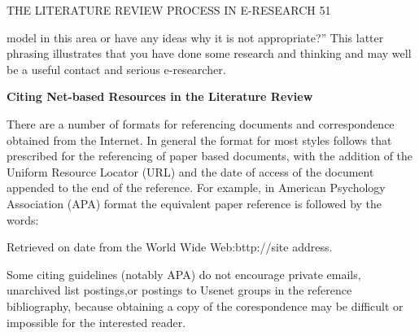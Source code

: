\documentclass[8pt]{beamer}
\begin{document}
\begin{frame}
\begin{flushright}
THE LITERATURE REVIEW PROCESS IN E-RESEARCH
\hspace{6mm}
51
\vspace{5mm}
\end{flushright}

model in this area or have any ideas why it is not appropriate?” This latter phrasing illustrates that you have done some research and thinking and may well be a useful contact and serious e-researcher.

\vspace{5mm}
\hspace{-2cm}
\textbf{Citing Net-based Resources in the Literature Review}
\vspace{3mm}

There are a number of formats for referencing documents and correspondence obtained from the Internet. In general the format for most styles follows that prescribed for the referencing of paper based documents, with the addition of the Uniform Resource Locator (URL) and the date of access of the document appended to the end of the reference. For example, in American Psychology Association (APA) format
the equivalent paper reference is followed by the words:

\vspace{3mm}
\hspace{1cm}

Retrieved on date from the World Wide Web:bttp://site address.

\vspace{3mm}
Some citing guidelines (notably APA) do not encourage private emails, unarchived list postings,or postings to Usenet groups in the reference bibliography, because obtaining a copy of the corespondence may be difficult or impossible for the interested reader.
\end{frame}
\end{document}
